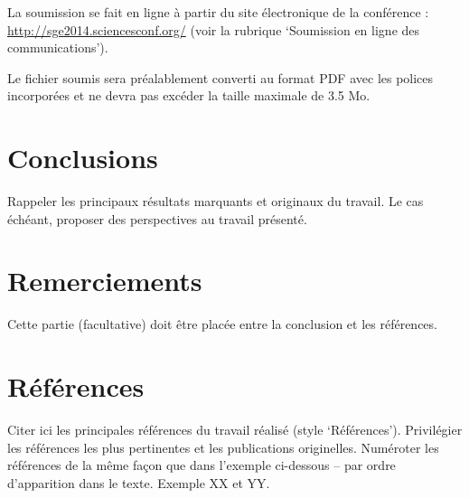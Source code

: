 \documentclass[a4paper,10pt,twocolumn]{article}
\begin{document}
La soumission se fait en ligne à partir du site électronique de la conférence : \url{http://sge2014.sciencesconf.org/} (voir la rubrique ‘Soumission en ligne des communications’).

Le fichier soumis sera préalablement converti au format PDF avec les polices incorporées et ne devra pas excéder la taille maximale de 3.5 Mo.

\section{Conclusions}

Rappeler les principaux résultats marquants et originaux du travail. Le cas échéant, proposer des perspectives au travail présenté.

\section{Remerciements}

Cette partie (facultative) doit être placée entre la conclusion et les références.

\section{Références}

Citer ici les principales références du travail réalisé (style ‘Références’). Privilégier les références les plus pertinentes et les publications originelles. Numéroter les références de la même façon que dans l’exemple ci-dessous – par ordre d’apparition dans le texte. Exemple XX\cite{bib_1} et YY\cite{bib_2,bib_3}.

\begin{thebibliography}{1}






\end{thebibliography}
\end{document}
